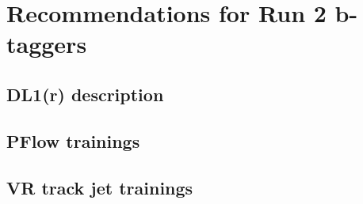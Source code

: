 \section{Recommendations for Run 2 b-taggers}

\subsection{DL1(r) description}

\subsection{PFlow trainings}



\subsection{VR track jet trainings}

